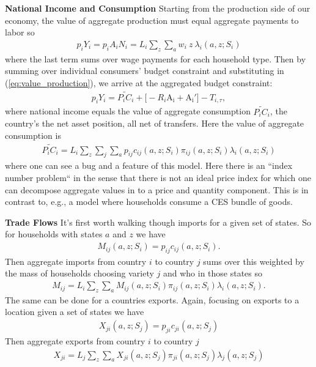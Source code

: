 \documentclass[12pt,pdftex]{article}
\begin{document}
\begin{onehalfspacing}
\textbf{National Income and Consumption} Starting from the production side of our economy, the value of aggregate production must equal aggregate payments to labor so
\begin{align}
p_{i} Y_{i} = p_{i} A_{i} N_{i} = L_i \sum_{z} \sum_{a} w_{i} \ z \ \lambda_i(a, z; S_i)
\label{eq:value_production}
\end{align}
where the last term sums over wage payments for each household type. Then by summing over individual consumers' budget constraint and substituting in (\ref{eq:value_production}), we arrive at the aggregated budget constraint:
\begin{align}
p_{i} Y_{i}  = \widetilde{P_{i} C_i}  + \bigg[-R_i\mathrm{A_i} +  \mathrm{A_i'} \bigg] - T_{i,\tau},
\label{eq:aggregate_budget_constraint}
\end{align}
where national income equals the value of aggregate consumption $\widetilde{P_{i} C_i}$, the country's the net asset position, all net of transfers. Here the value of aggregate consumption is
\begin{align}
\widetilde{P_{i} C_i} = L_{i} \sum_{z}\sum_{j}\sum_{a}  p_{ij} c_{ij}(a, z; S_i) \pi_{ij}(a, z; S_i) \lambda_i(a, z; S_i)
\end{align}
where one can see a bug and a feature of this model. Here there is an ``index number problem`` in the sense that there is not an ideal price index for which one can decompose aggregate values in to a price and quantity component. This is in contrast to, e.g., a model where households consume a CES bundle of goods.

\textbf{Trade Flows} It's first worth walking though imports for a given set of states. So for households with states $a$ and $z$ we have
\begin{align}
M_{ij}(a, z; S_i) = p_{ij} c_{ij}(a, z; S_i).
\end{align}
Then aggregate imports from country $i$ to country $j$ sums over this weighted by the mass of households choosing variety $j$ and who in those states so
\begin{align}
M_{ij} = L_i \sum_{z}\sum_{a} M_{ij}(a, z; S_i) \pi_{ij}(a, z; S_i) \lambda_i(a, z; S_i).
\label{eq:imports}
\end{align}
The same can be done for a countries exports. Again, focusing on exports to a location given a set of states we have
\begin{align}
X_{ji}(a, z; S_j) = p_{ji} c_{ji}(a, z; S_j) 
\end{align}
Then aggregate exports from country $i$ to country $j$
\begin{align}
X_{ji} = L_j \sum_{z}\sum_{a} X_{ji}(a, z; S_j) \pi_{ji}(a, z; S_j) \lambda_j(a, z; S_j)
\label{eq:exports}
\end{align}


\end{onehalfspacing}
\end{document}
